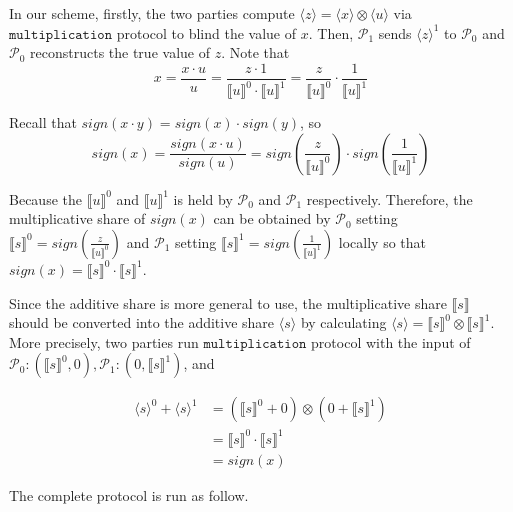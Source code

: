 \documentclass[letterpaper]{article} %
\begin{document}
    In our scheme, firstly, the two parties compute $ \langle z\rangle = \langle x\rangle\otimes \langle u\rangle$ via $\mathtt{multiplication}$ protocol
    to blind the value of $x$.
    Then, $\mathcal{P}_{1}$ sends  $ \langle z\rangle^{1}$ to $\mathcal{P}_{0}$ and
    $\mathcal{P}_{0}$ reconstructs the true value of $z$.
    Note that
    $$x=\frac{x\cdot u}{u}
        =\frac{z\cdot 1}{\llbracket u \rrbracket^{0}\cdot \llbracket u \rrbracket^{1}}
        =\frac{z}{\llbracket u \rrbracket^{0}}\cdot\frac{1}{\llbracket u \rrbracket^{1}}$$

    Recall that $sign(x\cdot y)=sign(x)\cdot sign(y)$, so
    $$sign(x)=\frac{sign(x \cdot u)}{sign(u)}
    =sign(\frac{z}{\llbracket u \rrbracket^{0}})
    \cdot sign(\frac{1}{\llbracket u \rrbracket^{1}})$$



    Because the $\llbracket u \rrbracket^{0}$ and $\llbracket u \rrbracket^{1}$
    is held by $\mathcal{P}_{0}$ and $\mathcal{P}_{1}$ respectively.
    Therefore, the multiplicative share of $sign(x)$ can be obtained by
    $\mathcal{P}_{0}$ setting $\llbracket s \rrbracket^{0}
    =sign(\frac{z}{\llbracket u \rrbracket^{0}})$
    and $\mathcal{P}_{1}$ setting $\llbracket s \rrbracket^{1}
    =sign(\frac{1}{\llbracket u \rrbracket^{1}})$ locally
    so that $sign(x)=\llbracket s \rrbracket^{0}\cdot \llbracket s \rrbracket^{1}$.

    Since the additive share is more general to use,
    the multiplicative share $\llbracket s \rrbracket$ should be converted into the additive share $\langle s\rangle$
    by calculating $\langle s\rangle = \llbracket s \rrbracket ^{0}\otimes \llbracket s \rrbracket ^{1}$.
    More precisely, two parties run $\mathtt{multiplication}$ protocol with the input of
    $\mathcal{P}_{0}:(\llbracket s \rrbracket ^{0},0),\mathcal{P}_{1}:(0,\llbracket s \rrbracket ^{1})$, and


    \begin{align*}
        \langle s\rangle^{0} +\langle s\rangle^{1}&=(\llbracket s \rrbracket ^{0}+0)\otimes (0+\llbracket s \rrbracket ^{1})\\
        &=\llbracket s \rrbracket ^{0}\cdot \llbracket s \rrbracket ^{1}\\
        &=sign(x)
    \end{align*}




       The complete protocol is run as follow.
\end{document}
